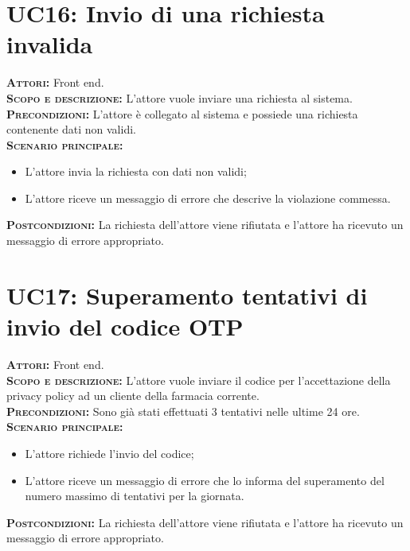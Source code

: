 \section{UC16: Invio di una richiesta invalida}
\label{sec:UC16}
\textsc{\textbf{Attori:}} Front end.\\
\textsc{\textbf{Scopo e descrizione:}} L'attore vuole inviare una richiesta al sistema.\\
\textsc{\textsc{\textbf{Precondizioni:}}} L'attore è collegato al sistema e possiede una richiesta contenente dati non validi.\\
\textsc{\textbf{Scenario principale:}}
\begin{itemize}
    \item L'attore invia la richiesta con dati non validi;
    \item L'attore riceve un messaggio di errore che descrive la violazione commessa.
\end{itemize}
\textsc{\textbf{Postcondizioni:}} La richiesta dell'attore viene rifiutata e l'attore ha ricevuto un messaggio di errore appropriato.

\section{UC17: Superamento tentativi di invio del codice OTP}
\label{sec:UC17}
\textsc{\textbf{Attori:}} Front end.\\
\textsc{\textbf{Scopo e descrizione:}} L'attore vuole inviare il codice per l'accettazione della privacy policy ad un cliente della farmacia corrente.\\
\textsc{\textsc{\textbf{Precondizioni:}}} Sono già stati effettuati 3 tentativi nelle ultime 24 ore.\\
\textsc{\textbf{Scenario principale:}}
\begin{itemize}
    \item L'attore richiede l'invio del codice;
    \item L'attore riceve un messaggio di errore che lo informa del superamento del numero massimo di tentativi per la giornata.
\end{itemize}
\textsc{\textbf{Postcondizioni:}} La richiesta dell'attore viene rifiutata e l'attore ha ricevuto un messaggio di errore appropriato.


